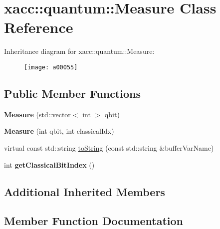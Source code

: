 \hypertarget{a00055}{}\section{xacc\+:\+:quantum\+:\+:Measure Class Reference}
\label{a00055}
Inheritance diagram for xacc\+:\+:quantum\+:\+:Measure\+:\begin{figure}[H]
\begin{center}
\leavevmode
\texttt{[image: a00055]}
\end{center}
\end{figure}
\subsection*{Public Member Functions}
\begin{DoxyCompactItemize}
\item 
{\bfseries Measure} (std\+::vector$<$ int $>$ qbit)\hypertarget{a00055_afe330a0eea029d842ff9c88a817dcc7d}{}\label{a00055_afe330a0eea029d842ff9c88a817dcc7d}

\item 
{\bfseries Measure} (int qbit, int classical\+Idx)\hypertarget{a00055_a9b8d9edca8ad2c3fb132780200f17335}{}\label{a00055_a9b8d9edca8ad2c3fb132780200f17335}

\item 
virtual const std\+::string \hyperlink{a00055_a1c51a5d68294dcb2ba1a9fbea63a730f}{to\+String} (const std\+::string \&buffer\+Var\+Name)
\item 
int {\bfseries get\+Classical\+Bit\+Index} ()\hypertarget{a00055_a0cb3c94731544042807236ade36fddd0}{}\label{a00055_a0cb3c94731544042807236ade36fddd0}

\end{DoxyCompactItemize}
\subsection*{Additional Inherited Members}


\subsection{Member Function Documentation}
